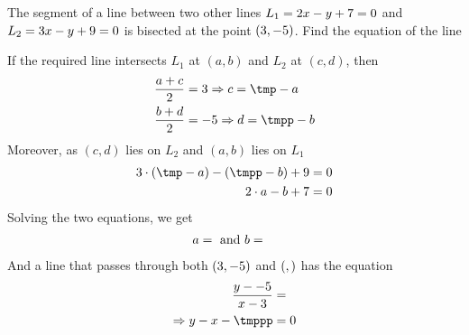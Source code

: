 \gcalcexpr[0]{\vbeight}{\vbthree * \vbseven + \vbfive} %
\gcalcexpr[0]{\vbnine}{\vbtwo - \vbeight} %
\gcalcexpr[0]{\vbten}{\vbone - \vbseven} %
\gcalcexpr[0]{\tmppp}{\vbten * \vbtwo - \vbnine * \vbone}

\question[4] The segment of a line between two other lines $L_1 = 2 x - y + 7 = 0$ and $L_2 = 3 x -y + 9 = 0$ is bisected at the point $(3, -5)$. Find the equation of the line


\watchout

\ifprintanswers
 
\fi 

\begin{solution}[\halfpage]
	If the required line intersects $L_1$ at $(a,b)$ and $L_2$ at $(c,d)$, then 
	\begin{align}
		\dfrac{a + c}{2} &= \vbone \Rightarrow c = \tmp - a \\
		\dfrac{b + d}{2} &= \vbtwo \Rightarrow d = \tmpp - b
	\end{align}
	Moreover, as $(c,d)$ lies on $L_2$ and $(a,b)$ lies on $L_1$
	\begin{align}
		\vbfour\cdot(\tmp - a) - (\tmpp - b) + \vbsix &= 0 \\
		\vbthree\cdot a - b + \vbfive &= 0 
	\end{align}
	Solving the two equations, we get 
	\begin{align}
		a &=  \text{ and } b = 
	\end{align}
	And a line that passes through both $(3, -5)$ and $(, )$ has the equation
	\begin{align}
		\dfrac{y - \vbtwo}{x - \vbone} &= \dfrac{\vbnine}{\vbten}\\
		\Rightarrow \vbten y - \vbnine x - \tmppp &= 0
	\end{align}
\end{solution}
